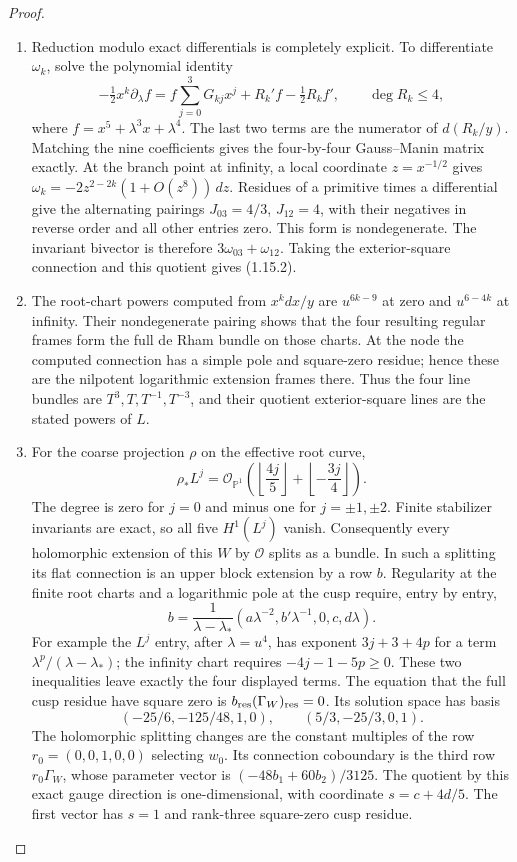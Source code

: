 \begin{proof}
\begin{enumerate}[label={$\langle1\rangle$\arabic*.}]
\item Reduction modulo exact differentials is completely explicit.  To
differentiate $\omega_k$, solve the polynomial identity
\[
-\tfrac12x^k\partial_\lambda f
 =f\sum_{j=0}^3G_{kj}x^j+R_k'f-\tfrac12R_kf',
 \qquad\deg R_k\leq4,
\]
where $f=x^5+\lambda^3x+\lambda^4$.  The last two terms are the
numerator of $d(R_k/y)$.  Matching the nine coefficients gives the
four-by-four Gauss--Manin matrix exactly.
At the branch point at infinity, a local coordinate $z=x^{-1/2}$
gives $\omega_k=-2z^{2-2k}(1+O(z^8))\,dz$.
Residues of a primitive times a differential give the alternating
pairings $J_{03}=4/3$, $J_{12}=4$, with their negatives in reverse
order and all other entries zero.  This form is nondegenerate.
The invariant bivector is therefore $3\omega_{03}+\omega_{12}$.
Taking the exterior-square connection and this quotient gives
(1.15.2).

\item The root-chart powers computed from $x^kdx/y$ are
$u^{6k-9}$ at zero and $u^{6-4k}$ at infinity.
Their nondegenerate pairing shows that the four resulting regular
frames form the full de Rham bundle on those charts.  At the node
the computed connection has a simple pole and square-zero residue;
hence these are the nilpotent logarithmic extension frames there.
Thus the four line bundles are
$T^3,T,T^{-1},T^{-3}$, and their quotient exterior-square lines are
the stated powers of $L$.

\item For the coarse projection $\rho$ on the effective root curve,
\[
 \rho_*L^j=\mathcal O_{\mathbb P^1}
 \left(\left\lfloor\frac{4j}{5}\right\rfloor+
       \left\lfloor-\frac{3j}{4}\right\rfloor\right).
\]
The degree is zero for $j=0$ and minus one for $j=\pm1,\pm2$.
Finite stabilizer invariants are exact, so all five $H^1(L^j)$ vanish.  Consequently every holomorphic
extension of this $W$ by $\mathcal O$ splits as a bundle.
In such a splitting its flat connection is an upper block extension
by a row $b$.  Regularity at the finite root charts and a logarithmic
pole at the cusp require, entry by entry,
\[
b=\frac1{\lambda-\lambda_*}
 (a\lambda^{-2},b'\lambda^{-1},0,c,d\lambda).
\]
For example the $L^j$ entry, after $\lambda=u^4$, has exponent
$3j+3+4p$ for a term $\lambda^p/ (\lambda-\lambda_*)$;
the infinity chart requires $-4j-1-5p\geq0$.
These two inequalities leave exactly the four displayed terms.
The equation that the full cusp residue have square zero is
$b_{\rm res}(\Gamma_W)_{\rm res}=0$.
Its solution space has basis
\[
(-25/6,-125/48,1,0),\qquad(5/3,-25/3,0,1).
\]
The holomorphic splitting changes are the constant multiples of the
row $r_0=(0,0,1,0,0)$ selecting $w_0$.  Its connection coboundary
is the third row $r_0\Gamma_W$, whose parameter vector is
$(-48b_1+60b_2)/3125$.  The quotient by this exact gauge direction
is one-dimensional, with coordinate $s=c+4d/5$.  The first
vector has $s=1$ and rank-three square-zero cusp residue.


\end{enumerate}
\end{proof}
